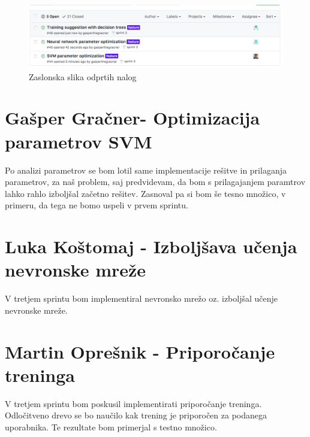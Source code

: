 \documentclass[a4paper,11pt]{article}
\begin{document}
\begin{figure}[h]
\caption{Zaslonska slika odprtih nalog}
\centering
\includegraphics[width=1\textwidth]{issues}
\end{figure}

\newpage
\section{Gašper Gračner- Optimizacija parametrov SVM}
Po analizi parametrov se bom lotil same implementacije rešitve in prilaganja parametrov, za naš problem, saj predvidevam, da bom s prilagajanjem paramtrov lahko rahlo izboljšal začetno rešitev. Zasnoval pa si bom še tesno množico, v primeru, da tega ne bomo uspeli v prvem sprintu.

\section{Luka Koštomaj - Izboljšava učenja nevronske mreže}

V tretjem sprintu bom implementiral nevronsko mrežo oz. izboljšal učenje nevronske mreže.

\section{Martin Oprešnik - Priporočanje treninga }

V tretjem sprintu bom poskusil implementirati priporočanje treninga. Odločitveno drevo se bo naučilo kak trening je priporočen za podanega uporabnika. Te rezultate bom primerjal s testno množico. 
\end{document}
